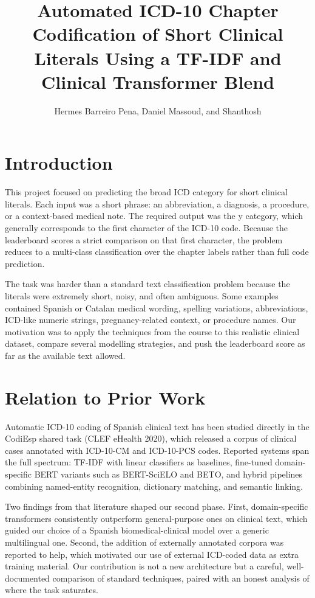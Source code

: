 \documentclass[9pt,a4paper,twoside]{utils/tau-class/tau}
\title{Automated ICD-10 Chapter Codification of Short Clinical Literals Using a TF-IDF and Clinical Transformer Blend}
\author{Hermes Barreiro Pena, Daniel Massoud, and Shanthosh}
\begin{document}
    \maketitle
    \thispagestyle{firststyle} \tauabstract
    \tableofcontents


\section{Introduction}

This project focused on predicting the broad ICD category for short clinical literals. Each input was a short phrase: an abbreviation, a diagnosis, a procedure, or a context-based medical note. The required output was the y category, which generally corresponds to the first character of the ICD-10 code. Because the leaderboard scores a strict comparison on that first character, the problem reduces to a multi-class classification over the chapter labels rather than full code prediction.

The task was harder than a standard text classification problem because the literals were extremely short, noisy, and often ambiguous. Some examples contained Spanish or Catalan medical wording, spelling variations, abbreviations, ICD-like numeric strings, pregnancy-related context, or procedure names. Our motivation was to apply the techniques from the course to this realistic clinical dataset, compare several modelling strategies, and push the leaderboard score as far as the available text allowed.

\section{Relation to Prior Work}

Automatic ICD-10 coding of Spanish clinical text has been studied directly in the CodiEsp shared task (CLEF eHealth 2020), which released a corpus of clinical cases annotated with ICD-10-CM and ICD-10-PCS codes. Reported systems span the full spectrum: TF-IDF with linear classifiers as baselines, fine-tuned domain-specific BERT variants such as BERT-SciELO and BETO, and hybrid pipelines combining named-entity recognition, dictionary matching, and semantic linking.

Two findings from that literature shaped our second phase. First, domain-specific transformers consistently outperform general-purpose ones on clinical text, which guided our choice of a Spanish biomedical-clinical model over a generic multilingual one. Second, the addition of externally annotated corpora was reported to help, which motivated our use of external ICD-coded data as extra training material. Our contribution is not a new architecture but a careful, well-documented comparison of standard techniques, paired with an honest analysis of where the task saturates.
\end{document}
